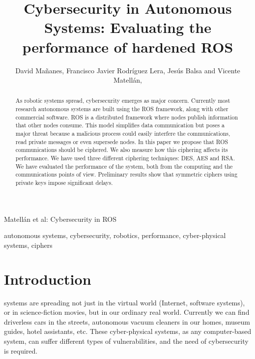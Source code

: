 \documentclass[journal,twoside]{JoPhA}
\begin{document}
\title{Cybersecurity in Autonomous Systems: Evaluating the performance of hardened ROS}

\author{David Ma\~nanes, Francisco Javier Rodr\'iguez Lera, Jes\'us Balsa and Vicente Matell\'an,
}


%
{Matell\'an et al: Cybersecurity in ROS}
\maketitle


\begin{abstract}
As robotic systems spread, cybersecurity emerges as major concern. Currently most research autonomous systems are built using the ROS framework, along with other commercial software. ROS is a distributed framework where nodes publish information that other nodes consume. This model simplifies data communication but poses a major threat because a malicious process could easily interfere the communications, read private messages or even supersede nodes. In this paper we propose that ROS communications should be ciphered. We also measure how this ciphering affects its performance. We have used three different ciphering techniques: DES, AES and RSA. We have evaluated the performance of the system, both from the computing and the communications points of view. Preliminary results show that symmetric ciphers using private keys impose significant delays.

\end{abstract}


\begin{IEEEkeywords}
autonomous systems, cybersecurity, robotics, performance, cyber-physical systems, ciphers
\end{IEEEkeywords}


\section{Introduction}

 systems are spreading not just in the virtual world (Internet, software systems), or in science-fiction movies, but in our ordinary real world. Currently we can find driverless cars in the streets, autonomous vacuum cleaners in our homes, museum guides, hotel assistants, etc. These cyber-physical systems, as any computer-based system, can suffer different types of vulnerabilities, and the need of cybersecurity \cite{Morante2015} is required. 
\end{document}
